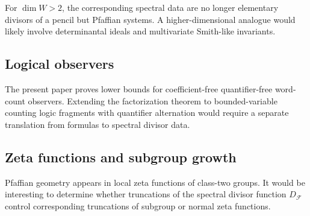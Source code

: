 \documentclass[11pt]{article}
\begin{document}
For $\dim W>2$, the corresponding spectral data are no longer elementary divisors of a pencil but Pfaffian systems. A higher-dimensional analogue would likely involve determinantal ideals and multivariate Smith-like invariants.

\subsection{Logical observers}

The present paper proves lower bounds for coefficient-free quantifier-free word-count observers. Extending the factorization theorem to bounded-variable counting logic fragments with quantifier alternation would require a separate translation from formulas to spectral divisor data.

\subsection{Zeta functions and subgroup growth}

Pfaffian geometry appears in local zeta functions of class-two groups. It would be interesting to determine whether truncations of the spectral divisor function $D_{\mathcal F}$ control corresponding truncations of subgroup or normal zeta functions.
\end{document}
